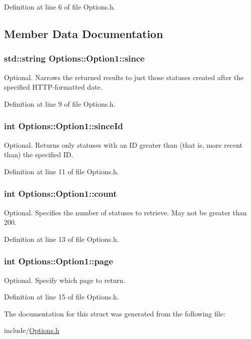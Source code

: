 Definition at line 6 of file Options.h.

\subsection{Member Data Documentation}
\hypertarget{structOptions_1_1Option1_2ab96937714ffcf4f979e156cd8bbc3e}{
\subsubsection{\setlength{\rightskip}{0pt plus 5cm}std::string {\bf Options::Option1::since}}}
\label{structOptions_1_1Option1_2ab96937714ffcf4f979e156cd8bbc3e}


Optional. Narrows the returned results to just those statuses created after the specified HTTP-formatted date. 



Definition at line 9 of file Options.h.\hypertarget{structOptions_1_1Option1_a0ea505d9a08567500ae53803f980697}{
\subsubsection{\setlength{\rightskip}{0pt plus 5cm}int {\bf Options::Option1::sinceId}}}
\label{structOptions_1_1Option1_a0ea505d9a08567500ae53803f980697}


Optional. Returns only statuses with an ID greater than (that is, more recent than) the specified ID. 



Definition at line 11 of file Options.h.\hypertarget{structOptions_1_1Option1_6d67aea8f3f1fc784d74db6daa84eeea}{
\subsubsection{\setlength{\rightskip}{0pt plus 5cm}int {\bf Options::Option1::count}}}
\label{structOptions_1_1Option1_6d67aea8f3f1fc784d74db6daa84eeea}


Optional. Specifies the number of statuses to retrieve. May not be greater than 200. 



Definition at line 13 of file Options.h.\hypertarget{structOptions_1_1Option1_d5fd1e637e8941192e7140ea69093b32}{
\subsubsection{\setlength{\rightskip}{0pt plus 5cm}int {\bf Options::Option1::page}}}
\label{structOptions_1_1Option1_d5fd1e637e8941192e7140ea69093b32}


Optional. Specify which page to return. 



Definition at line 15 of file Options.h.

The documentation for this struct was generated from the following file:\begin{CompactItemize}
\item 
include/\hyperlink{Options_8h}{Options.h}\end{CompactItemize}
